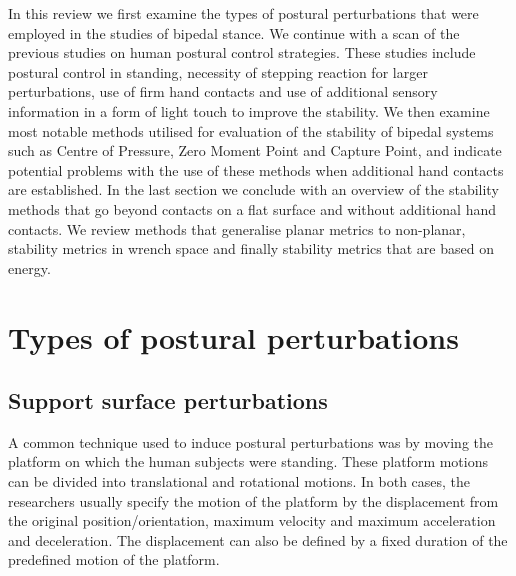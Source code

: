 \documentclass[12pt,a4paper,twoside]{article}
\begin{document}
In this review we first examine the types of postural perturbations that were employed in the studies of bipedal stance. We continue with a scan of the previous studies on human postural control strategies. These studies include postural control in standing, necessity of stepping reaction for larger perturbations, use of firm hand contacts and use of additional sensory information in a form of light touch to improve the stability. We then examine most notable methods utilised for evaluation of the stability of bipedal systems such as Centre of Pressure, Zero Moment Point and Capture Point, and indicate potential problems with the use of these methods when additional hand contacts are established. In the last section we conclude with an overview of the stability methods that go beyond contacts on a flat surface and without additional hand contacts. We review methods that generalise planar metrics to non-planar, stability metrics in wrench space and finally stability metrics that are based on energy.

\section{{Types of postural perturbations}}
\subsection{{Support surface perturbations}}
A common technique used to induce postural perturbations was by moving the platform on which the human subjects were standing. These platform motions can be divided into translational and rotational motions. In both cases, the researchers usually specify the motion of the platform by the displacement from the original position/orientation, maximum velocity and maximum acceleration and deceleration. The displacement can also be defined by a fixed duration of the predefined motion of the platform.
\end{document}
